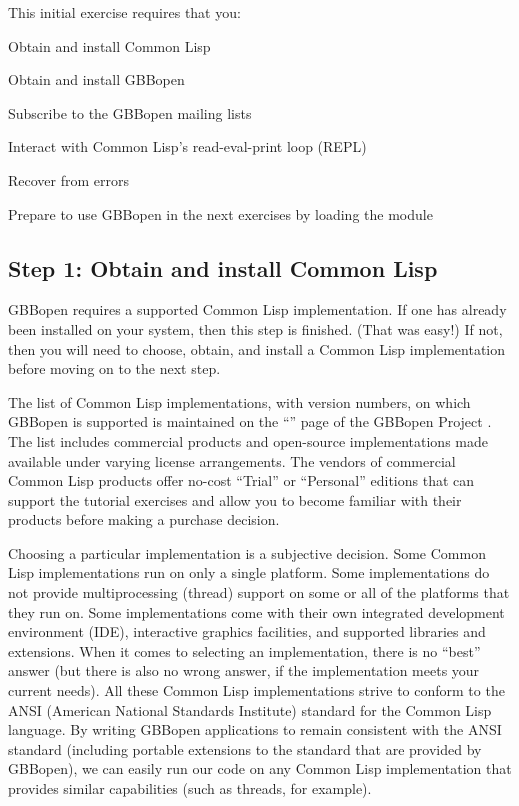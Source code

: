 \documentclass[10pt,twoside,english,pdftex]{article}
\begin{document}
This initial exercise requires that you:
\begin{tightitemize}
\item Obtain and install Common Lisp
\item Obtain and install GBBopen
\item Subscribe to the GBBopen mailing lists
\item Interact with Common Lisp's read-eval-print loop (REPL)
\item Recover from errors
\item Prepare to use GBBopen in the next exercises by loading the
   module
\end{tightitemize}

\fndocrule

\subsection*{Step 1: Obtain and install Common Lisp}

%
GBBopen requires a supported Common Lisp implementation.  If one has already
been installed on your system, then this step is finished.  (That was easy!)
If not, then you will need to choose, obtain, and install a Common Lisp
implementation before moving on to the next step.

The list of Common Lisp implementations, with version numbers, on which
GBBopen is supported is maintained on the ``'' page of the GBBopen Project
.  The list includes commercial
products and open-source implementations made available under varying license
arrangements.  The vendors of commercial Common Lisp products offer no-cost
``Trial'' or ``Personal'' editions that can support the tutorial exercises and
allow you to become familiar with their products before making a purchase
decision.

Choosing a particular implementation is a subjective decision.  Some Common
Lisp implementations run on only a single platform.  Some implementations do
not provide multiprocessing (thread) support on some or all of the platforms
that they run on.  Some implementations come with their own integrated
development environment (IDE), interactive graphics facilities, and supported
libraries and extensions.  When it comes to selecting an implementation, there
is no ``best'' answer (but there is also no wrong answer, if the
implementation meets your current needs).  All these Common Lisp
implementations strive to conform to the ANSI (American National Standards
Institute) standard for the Common Lisp language.  By writing GBBopen
applications to remain consistent with the ANSI standard (including portable
extensions to the standard that are provided by GBBopen), we can easily run
our code on any Common Lisp implementation that provides similar capabilities
(such as threads, for example).
\end{document}
